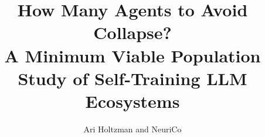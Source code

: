 \documentclass{article}
\title{How Many Agents to Avoid Collapse?\\
A Minimum Viable Population Study of Self-Training LLM Ecosystems}
\author{Ari Holtzman and NeuriCo}
\begin{document}
\maketitle

\begin{abstract}

\end{abstract}









\end{document}
